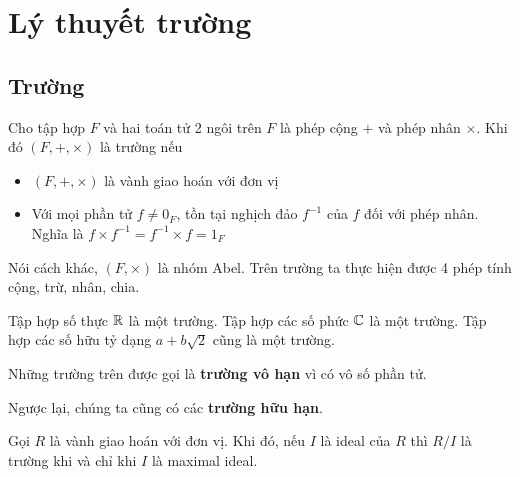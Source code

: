 \chapter{Lý thuyết trường}

\section{Trường}

\begin{definition}
    Cho tập hợp $F$ và hai toán tử 2 ngôi trên $F$ là phép cộng $+$ và phép nhân $\times$.
    Khi đó $(F, +, \times)$ là trường nếu
    \begin{itemize}[noitemsep]
        \item $(F, +, \times)$ là vành giao hoán với đơn vị
        \item Với mọi phần tử $f \neq 0_F$, tồn tại nghịch đảo $f^{-1}$ của $f$ đối với phép nhân. 
        Nghĩa là $f \times f^{-1} = f^{-1} \times f = 1_F$
    \end{itemize}
\end{definition}

Nói cách khác, $(F, \times)$ là nhóm Abel. Trên trường ta thực hiện được 4 phép tính cộng, trừ, nhân, chia.

\begin{example}
    Tập hợp số thực $\mathbb{R}$ là một trường. Tập hợp các số phức $\mathbb{C}$ là một trường.
    Tập hợp các số hữu tỷ dạng $a + b \sqrt{2}$ cũng là một trường.
\end{example}

Những trường trên được gọi là \textbf{trường vô hạn} vì có vô số phần tử.

Ngược lại, chúng ta cũng có các \textbf{trường hữu hạn}.

\begin{theorem}
    Gọi $R$ là vành giao hoán với đơn vị. Khi đó, nếu $I$ là ideal
    của $R$ thì $R / I$ là trường khi và chỉ khi $I$ là maximal ideal.
\end{theorem}

